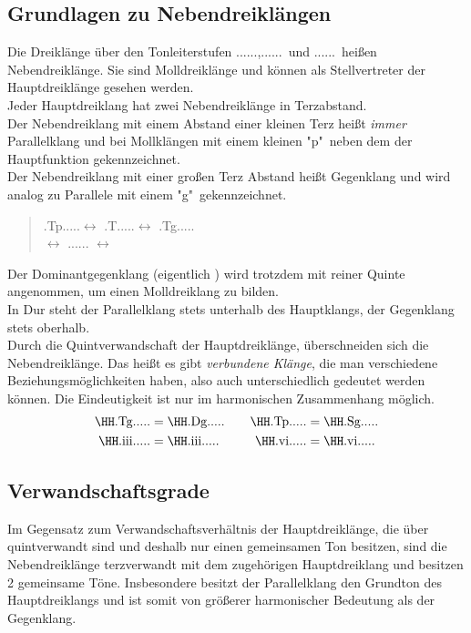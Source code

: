 \documentclass[a4paper]{article}
\newcommand{\dS}[1]{\HH.\uppercase\expandafter{\romannumeral #1\relax}.....} %
\newcommand{\mS}[1]{\textbf{\romannumeral #1}} %
\newcommand{\vermStufe}[1]{\textbf{\romannumeral #1\textdegree}} %
\newcommand{\T}{\HH.T.....}
\newcommand{\Tp}{\HH.Tp.....}
\newcommand{\Tg}{\HH.Tg.....}
\newcommand{\Sg}{\HH.Sg.....}
\newcommand{\Dg}{\HH.Dg.....}
\begin{document}
	\subsection{Grundlagen zu Nebendreiklängen}
	Die Dreiklänge über den Tonleiterstufen \dS{2},\dS{3}\ und \dS{6}\ heißen Nebendreiklänge. Sie sind Molldreiklänge und können als Stellvertreter der Hauptdreiklänge gesehen werden.\\
	Jeder Hauptdreiklang hat zwei Nebendreiklänge in Terzabstand.\\ 
	Der Nebendreiklang mit einem Abstand einer kleinen Terz heißt \textit{immer} Parallelklang und bei Mollklängen mit einem kleinen "p"\ neben dem der Hauptfunktion gekennzeichnet.\\
	Der Nebendreiklang mit einer großen Terz Abstand heißt Gegenklang und wird analog zu Parallele mit einem "g"\ gekennzeichnet.\\
	\begin{quote}
		\Tp $\longleftrightarrow$ \T $\longleftrightarrow$ \Tg\\
		\mS{6} $\longleftrightarrow$ \dS{1} $\longleftrightarrow$ \mS{3}
	\end{quote}
	Der Dominantgegenklang (eigentlich \vermStufe{7}) wird trotzdem mit reiner Quinte angenommen, um einen Molldreiklang zu bilden.\\
	In Dur steht der Parallelklang stets unterhalb des Hauptklangs, der Gegenklang stets oberhalb.\\
	Durch die Quintverwandschaft der Hauptdreiklänge, überschneiden sich die Nebendreiklänge. Das heißt es gibt \textit{verbundene Klänge}, die man verschiedene Beziehungsmöglichkeiten haben, also auch unterschiedlich gedeutet werden können. Die Eindeutigkeit ist nur im harmonischen Zusammenhang möglich.
	\begin{align}
	\text{\Tg} &= \text{\Dg}\quad & \text{\Tp} &= \text{\Sg} \nonumber\\
	\text{\dS{3}} &= \text{\dS{3}}\quad & \text{\dS{6}} &= \text{\dS{6}} \nonumber
	\end{align}
	
	\subsection{Verwandschaftsgrade}
	Im Gegensatz zum Verwandschaftsverhältnis der Hauptdreiklänge, die über quintverwandt sind und deshalb nur einen gemeinsamen Ton besitzen, sind die Nebendreiklänge terzverwandt mit dem zugehörigen Hauptdreiklang und besitzen 2 gemeinsame Töne. Insbesondere besitzt der Parallelklang den Grundton des Hauptdreiklangs und ist somit von größerer harmonischer Bedeutung als der Gegenklang.
	
\end{document}
